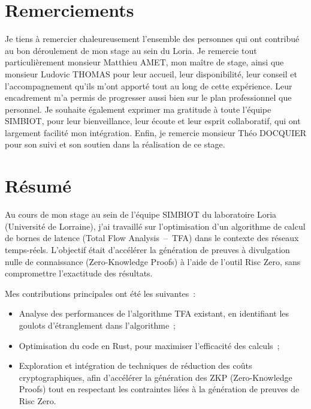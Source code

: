 \documentclass[12pt]{report}
\begin{document}
\chapter*{Remerciements}
\vspace{1em}
Je tiens à remercier chaleureusement l'ensemble des personnes qui ont 
contribué au bon déroulement de mon stage au sein du Loria.
Je remercie tout particulièrement monsieur Matthieu AMET, mon maître de 
stage, ainsi que monsieur Ludovic THOMAS pour leur accueil, leur disponibilité, 
leur conseil et l'accompagnement qu'ils m'ont apporté tout au long de cette expérience. 
Leur encadrement m'a permis de progresser aussi bien sur le plan 
professionnel que personnel.
Je souhaite également exprimer ma gratitude à toute l'équipe SIMBIOT, 
pour leur bienveillance, leur écoute et leur esprit collaboratif, 
qui ont largement facilité mon intégration.
Enfin, je remercie monsieur Théo DOCQUIER pour son suivi et son soutien 
dans la réalisation de ce stage.

\chapter*{Résumé}
\vspace{1em}

Au cours de mon stage au sein de l'équipe SIMBIOT du laboratoire Loria 
(Université de Lorraine), j'ai travaillé sur l'optimisation d'un algorithme 
de calcul de bornes de latence (Total Flow Analysis\ --\ TFA) dans le 
contexte des réseaux temps-réels. L'objectif était d'accélérer la 
génération de preuves à divulgation nulle de connaissance (Zero-Knowledge Proofs) à l'aide de l'outil Risc Zero, 
sans compromettre l'exactitude des résultats.

\vspace{0.2cm}

Mes contributions principales ont été les suivantes :
\begin{itemize}
    \item Analyse des performances de l'algorithme TFA existant, en identifiant les goulots d'étranglement dans l'algorithme ;
    \item Optimisation du code en Rust, pour maximiser l'efficacité des calculs ;
    \item Exploration et intégration de techniques de réduction des coûts cryptographiques, afin d'accélérer la génération des ZKP (Zero-Knowledge Proofs) tout en respectant les contraintes liées à la génération de preuves de Risc Zero.
\end{itemize}
\end{document}
